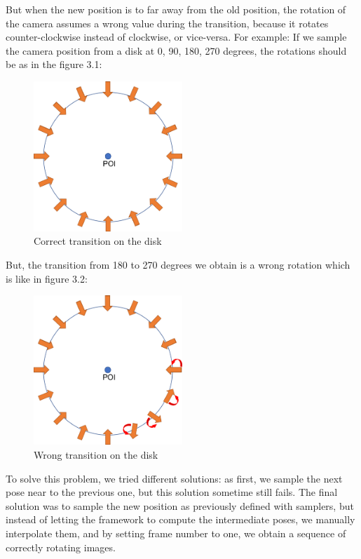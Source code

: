 But when the new position is to far away from the old position, the rotation of the camera assumes a wrong value during the transition, because it rotates counter-clockwise instead of clockwise, or vice-versa.
For example:
If we sample the camera position from a disk at 0, 90, 180, 270 degrees, the rotations should be as in the figure 3.1:
\begin{figure}[H]
    \centering
    \includegraphics[width=0.5\textwidth]{images/3_correct_transitions}
    \caption{Correct transition on the disk}\label{fig:correct-transition}
\end{figure}

But, the transition from 180 to 270 degrees we obtain is a wrong rotation which is like in figure 3.2:
\begin{figure}[H]
    \centering
    \includegraphics[width=0.5\textwidth]{images/3_wrong_transitions}
    \caption{Wrong transition on the disk}\label{fig:wrong-transition}
\end{figure}

To solve this problem, we tried different solutions: as first, we sample the next pose near to the previous one, but this solution sometime still fails.
The final solution was to sample the new position as previously defined with samplers, but instead of letting the framework to compute the intermediate poses, we manually interpolate them, and by setting frame number to one, we obtain a sequence of correctly rotating images.

